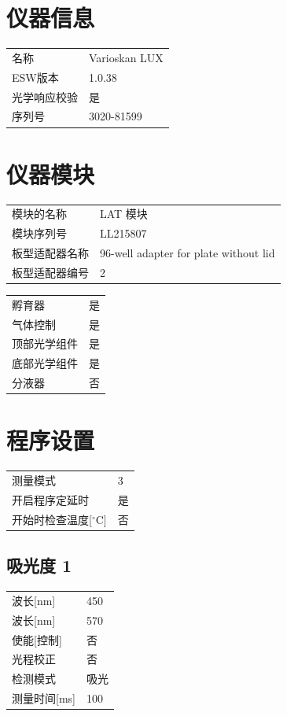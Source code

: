 \documentclass[UTF8,10pt,a4paper,fontset=fandol]{ctexart}
\begin{document}
\section*{仪器信息}

\begin{tabular}{@{}p{3.5cm}p{9cm}@{}}
名称 & Varioskan LUX\\
ESW版本 & 1.0.38\\
光学响应校验 & 是\\
序列号 & 3020-81599\\
\end{tabular}

\section*{仪器模块}

\begin{tabular}{@{}p{3.5cm}p{9cm}@{}}
模块的名称 & LAT 模块\\
模块序列号 & LL215807\\
板型适配器名称 & 96-well adapter for plate without lid\\
板型适配器编号 & 2\\
\end{tabular}

\begin{tabular}{@{}p{3.5cm}p{9cm}@{}}
孵育器 & 是\\
气体控制 & 是\\
顶部光学组件 & 是\\
底部光学组件 & 是\\
分液器 & 否\\
\end{tabular}

\section*{程序设置}

\begin{tabular}{@{}p{4cm}p{8cm}@{}}
测量模式 & 3\\
开启程序定延时 & 是\\
开始时检查温度[$^\circ$C] & 否\\
\end{tabular}

\subsection*{吸光度 1}

\begin{tabular}{@{}p{4cm}p{8cm}@{}}
波长[nm] & 450\\
波长[nm] & 570\\
使能[控制] & 否\\
光程校正 & 否\\
检测模式 & 吸光\\
测量时间[ms] & 100\\
\end{tabular}
\end{document}
